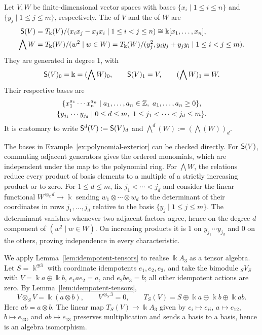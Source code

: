 \begin{example}\label{ex:polynomial-exterior}
Let $V,W$ be finite-dimensional vector spaces with bases $\{x_i\mid1\leq i\leq n\}$ and $\{y_j\mid1\leq j\leq m\}$, respectively.
The  of $V$ and the  of $W$ are
\begin{equation}\label{eq:polynomial-exterior}
\begin{aligned}
\mathsf{S}(V)&=T_\Bbbk(V)/(x_ix_j-x_jx_i\mid1\leq i<j\leq n)
            \cong\Bbbk[x_1,\ldots,x_n],\\
\bigwedge W&=T_\Bbbk(W)/(w^2\mid w\in W) = T_\Bbbk(W)/(y_j^2, y_iy_j+y_jy_i \mid 1\le i<j\le m).
\end{aligned}
\end{equation}
They are generated in degree $1$, with
\[
\mathsf{S}(V)_0=\Bbbk=(\bigwedge W)_0,\qquad
\mathsf{S}(V)_1=V,\qquad(\bigwedge W)_1=W.
\]
Their respective bases are
\[
\begin{gathered}
\{x_1^{a_1}\cdots x_n^{a_n}\mid a_1,\ldots,a_n\in\Z,\ a_1,\ldots,a_n\geq0\},\\
\{y_{j_1}\cdots y_{j_d}\mid0\leq d\leq m,\ 1\leq j_1<\cdots<j_d\leq m\}.
\end{gathered}
\]
It is customary to write $\mathsf{S}^d(V):= \mathsf{S}(V)_d$ and $\bigwedge^d(W):=(\bigwedge(W))_d$.
\end{example}

\begin{supplementary}
The bases in Example~\ref{ex:polynomial-exterior} can be checked directly.
For $\mathsf{S}(V)$, commuting adjacent generators gives the ordered monomials, which are independent under the map to the polynomial ring.
For $\bigwedge W$, the relations reduce every product of basis elements to a multiple of a strictly increasing product or to zero.
For $1\leq d\leq m$, fix $j_1<\cdots<j_d$ and consider the linear functional $W^{\otimes_\Bbbk d}\to\Bbbk$ sending $w_1\otimes\cdots\otimes w_d$ to the determinant of their coordinates in rows $j_1,\ldots,j_d$ relative to the basis $\{y_j\mid1\leq j\leq m\}$.
The determinant vanishes whenever two adjacent factors agree, hence on the degree $d$ component of $(w^2\mid w\in W)$.
On increasing products it is $1$ on $y_{j_1}\cdots y_{j_d}$ and $0$ on the others, proving independence in every characteristic.
\end{supplementary}


\begin{example}\label{ex:tensor-A3}
We apply Lemma~\ref{lem:idempotent-tensors} to realise $\Bbbk A_3$ as a tensor algebra.
Let $S=\Bbbk^{\oplus3}$ with coordinate idempotents $e_1,e_2,e_3$, and take the bimodule ${}_SV_S$ with $V=\Bbbk a\oplus\Bbbk b$, $e_1ae_2=a$, and $e_2be_3=b$; all other idempotent actions are zero.
By Lemma~\ref{lem:idempotent-tensors},
\[
V\otimes_S V=\Bbbk(a\otimes b),\qquad
V^{\otimes_S3}=0,\qquad
T_S(V)=S\oplus\Bbbk a\oplus\Bbbk b\oplus\Bbbk ab.
\]
Here $ab=a\otimes b$.
The linear map $T_S(V)\to\Bbbk A_3$ given by $e_i\mapsto e_{ii}$, $a\mapsto e_{12}$, $b\mapsto e_{23}$, and $ab\mapsto e_{13}$ preserves multiplication and sends a basis to a basis, hence is an algebra isomorphism.
\end{example}


